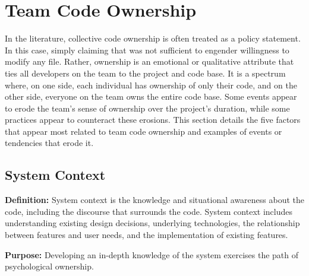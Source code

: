

\section{Team Code Ownership}
\label{TeamCodeOwnership}

In the literature, collective code ownership is often treated as a policy statement. In this case, simply claiming that  was not sufficient to engender willingness to modify any file. Rather, ownership is an emotional or qualitative attribute that ties all developers on the team to the project and code base. It is a spectrum where, on one side, each individual has ownership of only their code, and on the other side, everyone on the team owns the entire code base. Some events appear to erode the team's sense of ownership over the project's duration, while some practices appear to counteract these erosions. This section details the five factors that appear most related to team code ownership and examples of events or tendencies that erode it. 

\subsection{System Context}
\textbf{Definition:} System context is the knowledge and situational awareness about the code, including the discourse that surrounds the code. System context includes understanding existing design decisions, underlying technologies, the relationship between features and user needs, and the implementation of existing features.

\textbf{Purpose:} Developing an in-depth knowledge of the system exercises the  path of psychological ownership.


